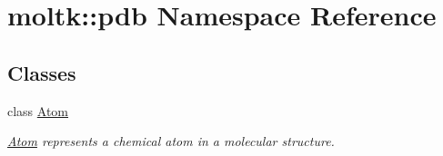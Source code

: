 \hypertarget{namespacemoltk_1_1pdb}{
\section{moltk\-:\-:pdb \-Namespace \-Reference}
\label{namespacemoltk_1_1pdb}
}
\subsection*{\-Classes}
\begin{DoxyCompactItemize}
\item 
class \hyperlink{classmoltk_1_1pdb_1_1Atom}{\-Atom}
\begin{DoxyCompactList}\small\item\em \hyperlink{classmoltk_1_1pdb_1_1Atom}{\-Atom} represents a chemical atom in a molecular structure. \end{DoxyCompactList}\end{DoxyCompactItemize}
